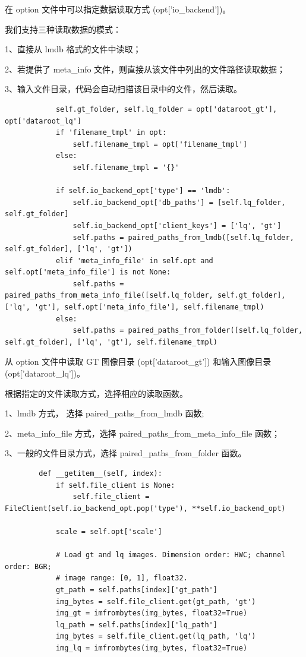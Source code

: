 \documentclass[../main.tex]{subfiles}
\begin{document}
    在 option 文件中可以指定数据读取方式 (opt['io\_backend'])。

    我们支持三种读取数据的模式：

    1、直接从 lmdb 格式的文件中读取；

    2、若提供了 meta\_info 文件，则直接从该文件中列出的文件路径读取数据；

    3、输入文件目录，代码会自动扫描该目录中的文件，然后读取。


    \begin{verbatim}
            self.gt_folder, self.lq_folder = opt['dataroot_gt'], opt['dataroot_lq']
            if 'filename_tmpl' in opt:
                self.filename_tmpl = opt['filename_tmpl']
            else:
                self.filename_tmpl = '{}'

            if self.io_backend_opt['type'] == 'lmdb':
                self.io_backend_opt['db_paths'] = [self.lq_folder, self.gt_folder]
                self.io_backend_opt['client_keys'] = ['lq', 'gt']
                self.paths = paired_paths_from_lmdb([self.lq_folder, self.gt_folder], ['lq', 'gt'])
            elif 'meta_info_file' in self.opt and self.opt['meta_info_file'] is not None:
                self.paths = paired_paths_from_meta_info_file([self.lq_folder, self.gt_folder], ['lq', 'gt'], self.opt['meta_info_file'], self.filename_tmpl)
            else:
                self.paths = paired_paths_from_folder([self.lq_folder, self.gt_folder], ['lq', 'gt'], self.filename_tmpl)
    \end{verbatim}

    从 option 文件中读取 GT 图像目录 (opt['dataroot\_gt']) 和输入图像目录 (opt['dataroot\_lq'])。

    根据指定的文件读取方式，选择相应的读取函数。

    1、lmdb 方式， 选择 paired\_paths\_from\_lmdb 函数;

    2、meta\_info\_file 方式，选择 paired\_paths\_from\_meta\_info\_file 函数；

    3、一般的文件目录方式，选择 paired\_paths\_from\_folder 函数。

    \begin{verbatim}
        def __getitem__(self, index):
            if self.file_client is None:
                self.file_client = FileClient(self.io_backend_opt.pop('type'), **self.io_backend_opt)

            scale = self.opt['scale']

            # Load gt and lq images. Dimension order: HWC; channel order: BGR;
            # image range: [0, 1], float32.
            gt_path = self.paths[index]['gt_path']
            img_bytes = self.file_client.get(gt_path, 'gt')
            img_gt = imfrombytes(img_bytes, float32=True)
            lq_path = self.paths[index]['lq_path']
            img_bytes = self.file_client.get(lq_path, 'lq')
            img_lq = imfrombytes(img_bytes, float32=True)
    \end{verbatim}
\end{document}
